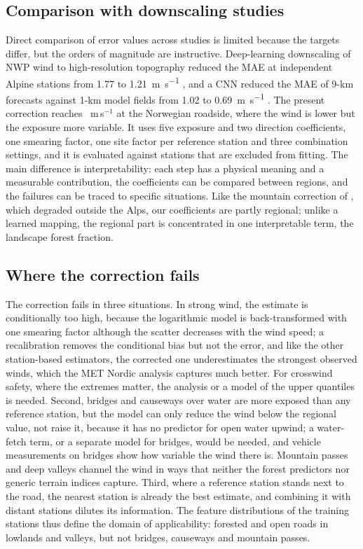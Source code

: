 \subsection{Comparison with downscaling studies}
Direct comparison of error values across studies is limited because the targets differ, but the orders of magnitude are instructive. Deep-learning downscaling of NWP wind to high-resolution topography reduced the MAE at independent Alpine stations from 1.77 to \SI{1.21}{m.s^{-1}} \citep{DujardinLehning2022}, and a CNN reduced the MAE of 9-km forecasts against 1-km model fields from 1.02 to \SI{0.69}{m.s^{-1}} \citep{Dupuy2023}. The present correction reaches \noCvMed~m\,s$^{-1}$ at the Norwegian roadside, where the wind is lower but the exposure more variable. It uses five exposure and two direction coefficients, one smearing factor, one site factor per reference station and three combination settings, and it is evaluated against stations that are excluded from fitting. The main difference is interpretability: each step has a physical meaning and a measurable contribution, the coefficients can be compared between regions, and the failures can be traced to specific situations. Like the mountain correction of \citet{LeToumelin2024}, which degraded outside the Alps, our coefficients are partly regional; unlike a learned mapping, the regional part is concentrated in one interpretable term, the landscape forest fraction.

\subsection{Where the correction fails}
The correction fails in three situations. In strong wind, the estimate is conditionally too high, because the logarithmic model is back-transformed with one smearing factor although the scatter decreases with the wind speed; a recalibration removes the conditional bias but not the error, and like the other station-based estimators, the corrected one underestimates the strongest observed winds, which the MET Nordic analysis captures much better. For crosswind safety, where the extremes matter, the analysis or a model of the upper quantiles is needed. Second, bridges and causeways over water are more exposed than any reference station, but the model can only reduce the wind below the regional value, not raise it, because it has no predictor for open water upwind; a water-fetch term, or a separate model for bridges, would be needed, and vehicle measurements on bridges \citep{Reymert2024} show how variable the wind there is. Mountain passes and deep valleys channel the wind in ways that neither the forest predictors nor generic terrain indices capture. Third, where a reference station stands next to the road, the nearest station is already the best estimate, and combining it with distant stations dilutes its information. The feature distributions of the training stations thus define the domain of applicability: forested and open roads in lowlands and valleys, but not bridges, causeways and mountain passes.

